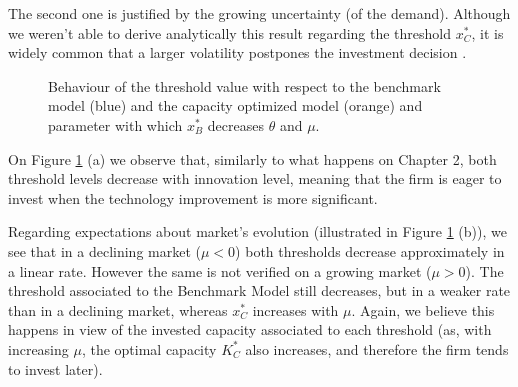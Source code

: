 The second one is justified by the growing uncertainty (of the demand). Although we weren't able to derive analytically this result regarding the threshold $x_C^*$, it is widely common that a larger volatility postpones the investment decision \cite{dixit:book}. 


\begin{figure}[!htb]
	\begin{subfigmatrix}{2}
	\end{subfigmatrix}
	\caption{Behaviour of the threshold value with respect to the benchmark model (blue) and the capacity optimized model (orange) and parameter with which  $x^*_B$ decreases $\theta$ and $\mu$.}
	\label{fig:2_x3}
\end{figure}



On Figure \ref{fig:2_x3} (a) we observe that, similarly to what happens on Chapter 2, both threshold levels decrease with innovation level, meaning that the firm is eager to invest when the technology improvement is more significant.

Regarding expectations about market's evolution (illustrated in Figure \ref{fig:2_x3} (b)), we see that in a declining market ($\mu<0$) both thresholds decrease approximately in a linear rate. However the same is not verified on a growing market ($\mu>0$). The threshold associated to the Benchmark Model still decreases, but in a weaker rate than in a declining market, whereas $x^*_C$ increases with $\mu$. Again, we believe this happens in view of the invested capacity associated to each threshold (as, with increasing $\mu$, the optimal capacity $K^*_C$ also increases, and therefore the firm tends to invest later).

